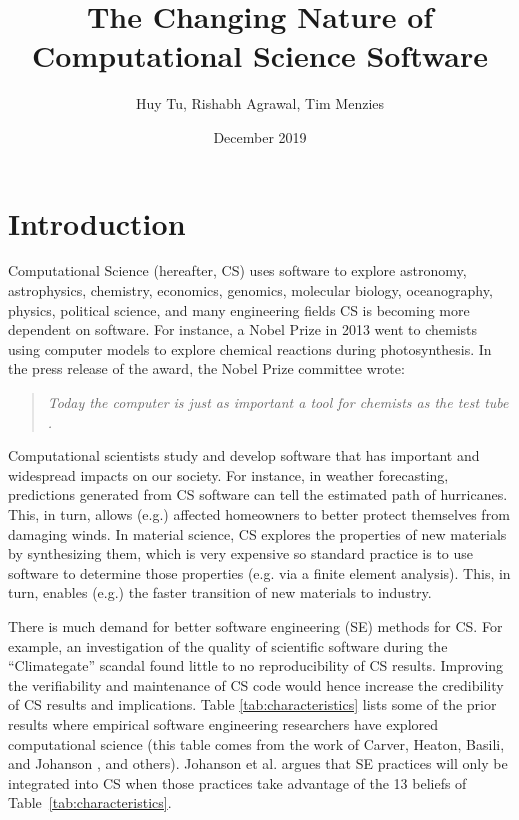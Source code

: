 \documentclass[sigconf,review,anonymous]{acmart}
\title[Changing  Nature of CS Software]{The Changing Nature of Computational Science Software}
\author{Huy Tu, Rishabh Agrawal, Tim Menzies}
\affiliation{ Computer Science, NC State, USA} \email{hqtu@ncsu.edu,  ragrawa3@ncsu.edu, timm@ieee.org}
\date{December 2019}
\begin{document}
\maketitle
\section{Introduction}
  

Computational Science (hereafter, CS)
uses software   to explore
 astronomy, astrophysics, chemistry, economics, genomics, molecular biology, oceanography, physics, political science,  and many   engineering fields 
CS is becoming more dependent on software. For instance, a Nobel Prize in 2013 went to chemists using computer models to explore chemical reactions during photosynthesis. In the press release of the award, the Nobel Prize committee wrote:
\begin{quote}
{\em Today the computer is just as important a tool for chemists as the test tube \cite{nobel_2013}.}
\end{quote}


Computational scientists study and develop software that has important and widespread impacts on our society. For instance, in weather forecasting, predictions generated from CS
software can tell the estimated path of hurricanes. This, in turn,
allows (e.g.) affected homeowners to better protect themselves from
damaging winds. In material science, CS explores the properties
of new materials by synthesizing them, which is very expensive so standard practice is to use software to determine
those properties (e.g. via a finite element analysis). This, in turn, enables (e.g.) the faster transition of new materials to industry.


There is much demand for better software engineering (SE) methods
for CS. For example, an investigation of the 
quality of scientific software during the ``Climategate'' scandal \cite{merali10_error} found little to no reproducibility of CS results. Improving the verifiability and maintenance of CS code would hence increase the credibility of CS results and implications. Table \ref{tab:characteristics}
lists some of the prior results
where empirical software
engineering researchers have explored computational science
(this table comes from the work of
Carver, Heaton, Basili, and Johanson \cite{carver13_perception, carver07_environment, basili08_hpc, heaton15_lit, johan18_secs}, and others).
Johanson et al. \cite{johan18_secs}   argues that SE practices will only be integrated into CS when
those practices take advantage of
the   13 beliefs  of
Table~\ref{tab:characteristics}. 
 
\end{document}
